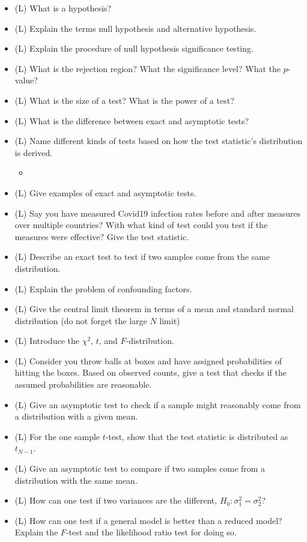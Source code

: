 \begin{itemize}
    \item (L) What is a hypothesis?
    \item (L) Explain the terms null hypothesis and alternative hypothesis.
    \item (L) Explain the procedure of null hypothesis significance testing.
    \item (L) What is the rejection region? What the significance level? What the $p$-value?
    \item (L) What is the size of a test? What is the power of a test?
    \item (L) What is the difference between exact and asymptotic tests?
    \item (L) Name different kinds of tests based on how the test statistic's distribution is derived.
    \begin{itemize}
        \item {}
    \end{itemize}
    \item (L) Give examples of exact and asymptotic tests.
    \item (L) Say you have measured Covid19 infection rates before and after measures over multiple countries? With what kind of test could you test if the measures were effective? Give the test statistic.
    \item (L) Describe an exact test to test if two samples come from the same distribution.
    \item (L) Explain the problem of confounding factors.
    \item (L) Give the central limit theorem in terms of a mean and standard normal distribution (do not forget the large $N$ limit)
    \item (L) Introduce the $\chi^2$, $t$, and $F$-distribution.
    \item (L) Consider you throw balls at boxes and have assigned probabilities of hitting the boxes. Based on observed counts, give a test that checks if the assumed probabilities are reasonable.
    \item (L) Give an asymptotic test to check if a sample might reasonably come from a distribution with a given mean.
    \item (L) For the one sample $t$-test, show that the test statistic is distributed as $t_{N-1}$.
    \item (L) Give an asymptotic test to compare if two samples come from a distribution with the same mean.
    \item (L) How can one test if two variances are the different, $H_0: \sigma_1^2 = \sigma_2^2$?
    \item (L) How can one test if a general model is better than a reduced model? Explain the $F$-test and 
    the likelihood ratio test for doing so.
\end{itemize}

